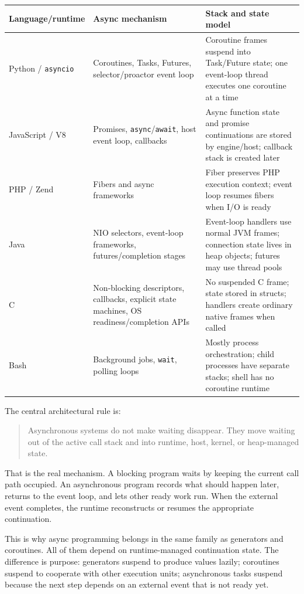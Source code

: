 \begin{center}
\begin{tabular}{|p{}|p{}|p{}|}
\hline
\textbf{Language/runtime} & \textbf{Async mechanism} & \textbf{Stack and state model} \\
\hline
Python / \texttt{asyncio} & Coroutines, Tasks, Futures, selector/proactor event loop & Coroutine frames suspend into Task/Future state; one event-loop thread executes one coroutine at a time \\
\hline
JavaScript / V8 & Promises, \texttt{async}/\texttt{await}, host event loop, callbacks & Async function state and promise continuations are stored by engine/host; callback stack is created later \\
\hline
PHP / Zend & Fibers and async frameworks & Fiber preserves PHP execution context; event loop resumes fibers when I/O is ready \\
\hline
Java & NIO selectors, event-loop frameworks, futures/completion stages & Event-loop handlers use normal JVM frames; connection state lives in heap objects; futures may use thread pools \\
\hline
C & Non-blocking descriptors, callbacks, explicit state machines, OS readiness/completion APIs & No suspended C frame; state stored in structs; handlers create ordinary native frames when called \\
\hline
Bash & Background jobs, \texttt{wait}, polling loops & Mostly process orchestration; child processes have separate stacks; shell has no coroutine runtime \\
\hline
\end{tabular}
\end{center}

The central architectural rule is:

\begin{quote}
Asynchronous systems do not make waiting disappear. They move waiting out of the active call stack and into runtime, host, kernel, or heap-managed state.
\end{quote}

That is the real mechanism. A blocking program waits by keeping the current call path occupied. An asynchronous program records what should happen later, returns to the event loop, and lets other ready work run. When the external event completes, the runtime reconstructs or resumes the appropriate continuation.

This is why async programming belongs in the same family as generators and coroutines. All of them depend on runtime-managed continuation state. The difference is purpose: generators suspend to produce values lazily; coroutines suspend to cooperate with other execution units; asynchronous tasks suspend because the next step depends on an external event that is not ready yet.